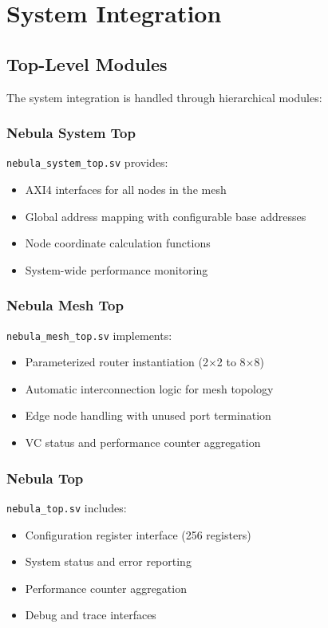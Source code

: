 \documentclass[12pt,letterpaper]{article}
\begin{document}
\section{System Integration}

\subsection{Top-Level Modules}

The system integration is handled through hierarchical modules:

\subsubsection{Nebula System Top}

\texttt{nebula\_system\_top.sv} provides:

\begin{itemize}
    \item AXI4 interfaces for all nodes in the mesh
    \item Global address mapping with configurable base addresses
    \item Node coordinate calculation functions
    \item System-wide performance monitoring
\end{itemize}

\subsubsection{Nebula Mesh Top}

\texttt{nebula\_mesh\_top.sv} implements:

\begin{itemize}
    \item Parameterized router instantiation (2×2 to 8×8)
    \item Automatic interconnection logic for mesh topology
    \item Edge node handling with unused port termination
    \item VC status and performance counter aggregation
\end{itemize}

\subsubsection{Nebula Top}

\texttt{nebula\_top.sv} includes:

\begin{itemize}
    \item Configuration register interface (256 registers)
    \item System status and error reporting
    \item Performance counter aggregation
    \item Debug and trace interfaces
\end{itemize}
\end{document}

